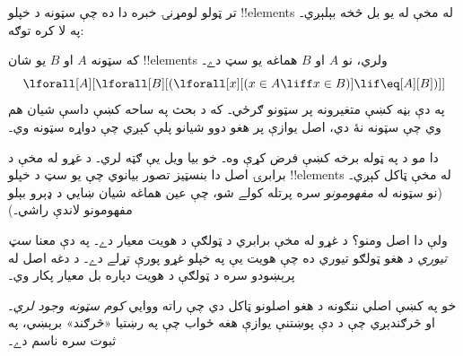 \documentclass[../../../include/open-logic-section]{subfiles}
\begin{document}

تر ټولو لومړنۍ خبره دا ده چې سټونه د خپلو !!{element}s له مخې
له يو بل څخه بېلېږي۔ په لا کره توګه:

\begin{axiom}
که سټونه $A$ او $B$ يو شان !!{element}s ولري، نو $A$ او $B$
هماغه يو سټ دے۔
\[
  \lforall[A][\lforall[B][(\lforall[x][(x \in A \liff x \in B)] \lif
  \eq[A][B])]]
\]
په دې بڼه کښې متغيرونه پر سټونو ګرځي۔ که د بحث په ساحه
کښې داسې شيان هم وي چې سټونه نۀ دي، اصل يوازې پر هغو دوو
شيانو پلې کېږي چې دواړه سټونه وي۔
\end{axiom}

دا مو د  په ټوله برخه کښې فرض کړې وه۔
خو بيا ويل يې ګټه لري۔ د غړو له مخې د برابرۍ اصل دا بنسټيز
تصور بيانوي چې يو سټ د خپلو !!{element}s له مخې ټاکل کېږي۔
(نو سټونه له \emph{مفهومونو} سره پرتله کولے شو، چې عين هماغه
شيان ښايي د ډېرو بېلو مفهومونو لاندې راشي۔)

ولې دا اصل ومنو؟ د غړو له مخې برابري د ټولګې د هويت
معيار دے۔ په دې معنا \emph{سټ تيوري} د هغو ټولګو تيوري
ده چې هويت يې په خپلو غړو پورې تړلے دے۔ د دغه اصل له
پرېښودو سره د ټولګې د هويت دپاره بل معيار پکار وي۔

خو په  کښې اصلي ننګونه د هغو اصلونو
ټاکل دي چې راته ووايي \emph{کوم سټونه وجود لري}۔ او څرګندېږي
چې د دې پوښتنې يوازې هغه ځواب چې په رښتيا «څرګند» برېښي،
په ثبوت سره ناسم دے۔
\end{document}
